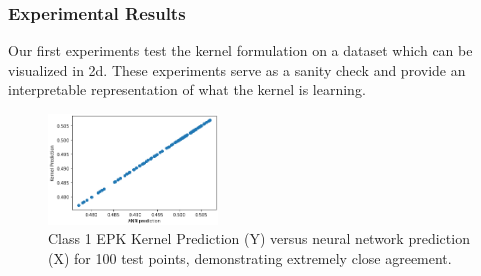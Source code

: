 \begin{frame}
\frametitle{Experimental Results}
    Our first experiments test the kernel formulation on a dataset 
    which can be visualized in 2d. These experiments serve as a sanity check
    and provide an interpretable representation of what the kernel is learning.
    \begin{figure}[!ht]
        \centering

        \includegraphics[width=0.40\textwidth]{c4_figures/image.png}
        \caption{Class 1 EPK Kernel Prediction (Y) versus neural network prediction (X) for 100 test points, demonstrating extremely close agreement.}
        \label{fig:toymatch}
    \end{figure}
\end{frame}

